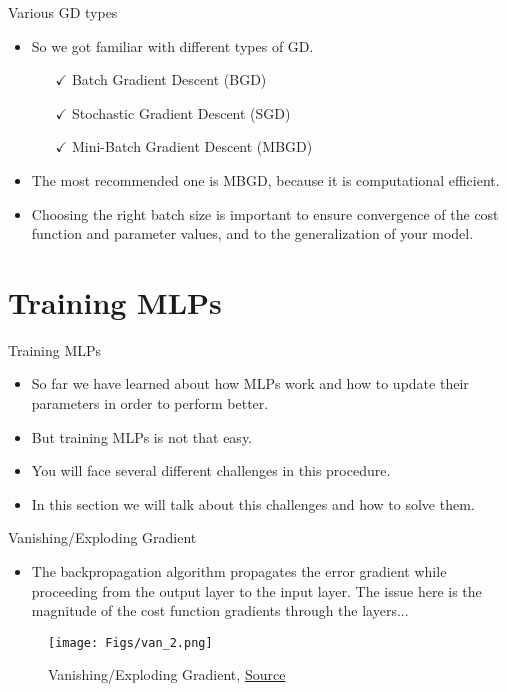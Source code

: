 \documentclass[compress,oilve,t]{beamer}
\begin{document}
\begin{frame}{Various GD types}
	\begin{itemize}
		\item So we got familiar with different types of GD.
		\begin{itemize}
			\item[\color{darkgreen}$\checkmark$] Batch Gradient Descent (BGD)
			\item[\color{darkgreen}$\checkmark$] Stochastic Gradient Descent (SGD)
			\item[\color{darkgreen}$\checkmark$] Mini-Batch Gradient Descent (MBGD)
		\end{itemize}
		\item[]
		\item[]
		\item The most recommended one is MBGD, because it is computational efficient.
		\item Choosing the right batch size is important to ensure convergence of the cost function and parameter values, and to the generalization of your model.
	\end{itemize}
\end{frame}

\section{Training MLPs}
\begin{frame}{Training MLPs}
	\begin{itemize}
		\item So far we have learned about how MLPs work and how to update their parameters in order to perform better.
		\item But training MLPs is not that easy.
		\item You will face several different challenges in this procedure.
		\item In this section we will talk about this challenges and how to solve them.
	\end{itemize}
\end{frame}


\begin{frame}{Vanishing/Exploding Gradient}
	\begin{itemize}
		\item The backpropagation algorithm propagates the error gradient while proceeding from the output layer to the input layer. The issue here is the magnitude of the cost function gradients through the layers... 
	\end{itemize}
	\begin{figure}
		\centering
		\texttt{[image: Figs/van\_2.png]}
		\caption{Vanishing/Exploding Gradient, \href{https://medium.com/@ayushch612/vanishing-gradient-and-exploding-gradient-problems-7737c0aa535f}{Source}}
	\end{figure}
\end{frame}
\end{document}
